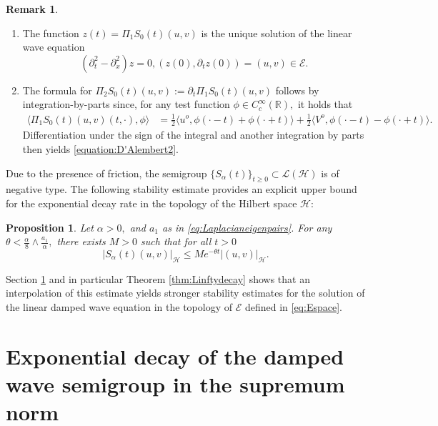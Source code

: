 \documentclass[10pt, reqno]{amsart}
\newcommand{\R}{\mathbb{R}}
\newcommand{\h}{\mathcal{H}}
\newcommand{\e}{\mathcal{E}}
\newtheorem{prop}{Proposition}
\theoremstyle{definition}
\newtheorem{rem}{Remark}
\numberwithin{lem}{section}
\numberwithin{cor}{section}
\numberwithin{prop}{section}
\numberwithin{thm}{section}
\numberwithin{dfn}{section}
\begin{document}
 \begin{rem} \begin{enumerate}
     \item The function $z(t)=\Pi_1S_0(t)(u,v)$ is the unique solution of the linear wave equation $$(\partial^2_t- \partial^2_x)z=0, (z(0),\partial_tz(0))=(u,v)\in\e.$$  

 \item The formula for $\Pi_2S_0(t)(u,v):=\partial_t \Pi_1S_0(t)(u,v)$ follows by integration-by-parts since, for any test function $\phi\in C^\infty_{c}(\R),$ it holds that
\begin{equation*}\label{testv}
\begin{aligned}
\langle   \Pi_1S_0(t)(u,v)(t,\cdot), \phi\rangle&=\frac{1}{2}\langle u^o, \phi(\cdot-t)+\phi(\cdot+t)\rangle
+\frac{1}{2}\langle V^o, \phi(\cdot-t)-\phi(\cdot+t)\rangle.
\end{aligned}
\end{equation*}
\noindent Differentiation under the sign of the integral and another integration by parts then yields \eqref{equation:D'Alembert2}.
\end{enumerate}   
 \end{rem}
 
 
 

Due to the presence of friction, the semigroup  $\{S_\alpha(t)\}_{t\geq 0}\subset\mathscr{L}(\h)$ is of negative type. The following stability estimate provides an explicit upper bound for the exponential decay rate in the topology of the Hilbert space $\h$:
\begin{prop}{\cite[Ch.IV, Proposition 1.2]{temam2012infinite}}\label{prop:L2-decay} Let $\alpha>0,$ and $ a_1$ as in \eqref{eq:Laplacianeigenpairs}.  For any $\theta<\tfrac{\alpha}{8}\wedge\tfrac{a_1}{\alpha},$ there exists $M>0$ such that for all $t>0$
$$ |S_\alpha(t)(u,v)|_{\h}\leq Me^{-\theta t}|(u,v)|_{\h}.      $$
\end{prop}

Section \ref{Sec:Linfty-decay}  and in particular Theorem \ref{thm:Linftydecay} shows that an interpolation of this estimate yields stronger stability estimates for the solution of the linear damped wave equation in the topology of $\e$ defined in \eqref{eq:Espace}. 




\section{Exponential decay of the damped wave semigroup in the supremum norm} \label{Sec:Linfty-decay}
\end{document}
